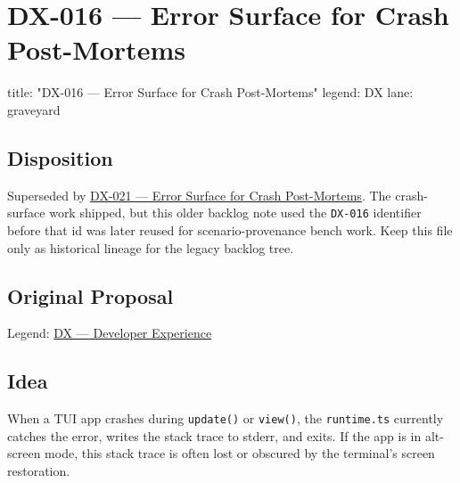 \chapter{DX-016 --- Error Surface for Crash Post-Mortems}\label{record-321}

\smallskip

\begin{RecordMeta}
title: "DX-016 — Error Surface for Crash Post-Mortems"
legend: DX
lane: graveyard

\end{RecordMeta}

\section{Disposition}\label{record-321-disposition}

Superseded by \href{https://github.com/flyingrobots/bijou/blob/cbd70612140e7a450d764b3c7be1c6af878b99bc/docs/method/retro/DX-021-error-surface-post-mortem.md}{DX-021 --- Error Surface for Crash Post-Mortems}. The crash-surface work shipped, but this older backlog note used the \texttt{D\allowbreak{}X\allowbreak{}-\allowbreak{}0\allowbreak{}1\allowbreak{}6} identifier before that id was later reused for scenario-provenance bench work. Keep this file only as historical lineage for the legacy backlog tree.

\section{Original Proposal}\label{record-321-original-proposal}

Legend: \href{https://github.com/flyingrobots/bijou/blob/1853ad902f6bf219326409e7f743a5a1d6517dbc/docs/method/legends/DX-developer-experience.md}{DX --- Developer Experience}

\section{Idea}\label{record-321-idea}

When a TUI app crashes during \texttt{u\allowbreak{}p\allowbreak{}d\allowbreak{}a\allowbreak{}t\allowbreak{}e\allowbreak{}(\allowbreak{})} or \texttt{v\allowbreak{}i\allowbreak{}e\allowbreak{}w\allowbreak{}(\allowbreak{})}, the \texttt{r\allowbreak{}u\allowbreak{}n\allowbreak{}t\allowbreak{}i\allowbreak{}m\allowbreak{}e\allowbreak{}.\allowbreak{}t\allowbreak{}s} currently catches the error, writes the stack trace to stderr, and exits. If the app is in alt-screen mode, this stack trace is often lost or obscured by the terminal's screen restoration.

